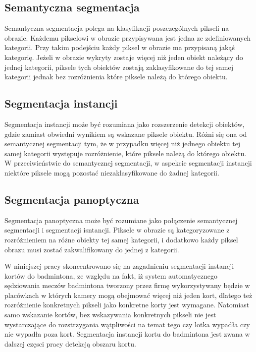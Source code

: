 \subsection*{Semantyczna segmentacja}
Semantyczna segmentacja polega na klasyfikacji poszczególnych pikseli na obrazie. Każdemu pikselowi w obrazie przypisywana jest jedna ze zdefiniowanych kategorii. Przy takim podejściu każdy piksel w obrazie ma przypisaną jakąś kategorię. Jeżeli w obrazie wykryty zostaje więcej niż jeden obiekt należący do jednej kategorii, piksele tych obiektów zostają zaklasyfikowane do tej samej kategorii jednak bez rozróżnienia które piksele należą do którego obiektu.
\cite{survey-semantic-segmentation}

\subsection*{Segmentacja instancji}
Segmentacja instancji może być rozumiana jako rozszerzenie detekcji obiektów, gdzie zamiast obwiedni wynikiem są wskazane piksele obiektu. Różni się ona od semantycznej segmentacji tym, że w przypadku więcej niż jednego obiektu tej samej kategorii występuje rozróżnienie, które piksele należą do którego obiektu. W przeciwieństwie do semantycznej segmentacji, w aspekcie segmentacji instancji niektóre piksele mogą pozostać niezaklasyfikowane do żadnej kategorii.

\subsection*{Segmentacja panoptyczna}
Segmentacja panoptyczna może być rozumiane jako połączenie semantycznej segmentacji i segmentacji isntancji. Piksele w obrazie są kategoryzowane z rozróżnieniem na różne obiekty tej samej kategorii, i dodatkowo każdy piksel obrazu musi zostać zakwalifikowany do jednej z kategorii.

\vspace{0.5cm}

W niniejszej pracy skoncentrowano się na zagadnieniu segmentacji instancji kortów do badmintona, ze względu na fakt, iż system automatycznego sędziowania meczów badmintona tworzony przez firmę \blue{} wykorzystywany będzie w placówkach w których kamery mogą obejmować więcej niż jeden kort, dlatego też rozróżnienie konkretnych pikseli jako konkretne korty jest wymagane. Natomiast samo wskazanie kortów, bez wskazywania konkretnych pikseli nie jest wystarczające do rozstrzygania wątpliwości na temat tego czy lotka wypadła czy nie wypadła poza kort. Segmentacja instancji kortu do badmintona jest zwana w dalszej częsci pracy detekcją obszaru kortu.

